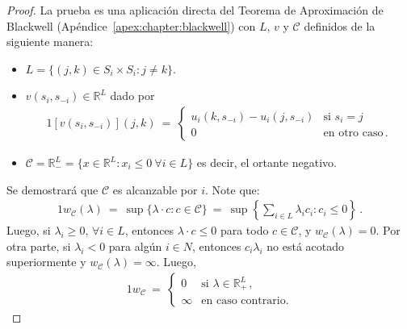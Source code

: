 \begin{proof}
La prueba es una aplicación directa del Teorema de Aproximación de Blackwell (Apéndice~\ref{apex:chapter:blackwell}) con $L$, $v$ y $\mathcal{C}$ definidos de la siguiente manera:
\begin{itemize}[noitemsep]
  \item $L = \{ (j, k) \in S_i \times S_{i}  : j \neq k \}$.
  \item $v(s_i, s_{-i}) \in \mathbb{R}^L$ dado por
    \begin{alignat}{1}
      [v(s_i, s_{-i})](j, k)\ =\  
        \begin{cases}
          u_i(k, s_{-i}) - u_i(j, s_{-i}) & \text{si } s_i = j \\
          0 & \text{en otro caso} \,.
        \end{cases}
    \end{alignat}
  \item $\mathcal{C} = \mathbb{R}^L_{-} = \{x \in \mathbb{R}^L : x_i \leq 0\ \forall i \in L \}$ es decir, el ortante negativo.
\end{itemize}

Se demostrará que $\mathcal{C}$ es alcanzable por $i$.
Note que:
\begin{alignat}{1}
	w_{\mathcal{C}}(\lambda)\ =\ \sup\{\lambda \cdot c : c \in \mathcal{C} \}\ =\ \sup \left \{ \sum_{i \in L} \lambda_i c_i : c_i \leq 0 \right \} \,.
\end{alignat}
Luego, si $\lambda_i \geq 0$, $\forall i \in L$, entonces $\lambda \cdot c \leq 0$ para todo $c \in \mathcal{C}$, y $w_{\mathcal{C}}(\lambda) = 0$. Por otra parte, si $\lambda_i < 0$ para algún $i\in N$, entonces $c_i \lambda_i$ no está acotado superiormente y  $w_{\mathcal{C}}(\lambda) = \infty$. Luego,
\begin{alignat}{1}
  w_{\mathcal{C}}\ =\  
	\begin{cases}
	  0 & \text{si } \lambda \in \mathbb{R}^L_+ \,, \\
	  \infty & \text{en caso contrario.}
	\end{cases}
\end{alignat}


\end{proof}
